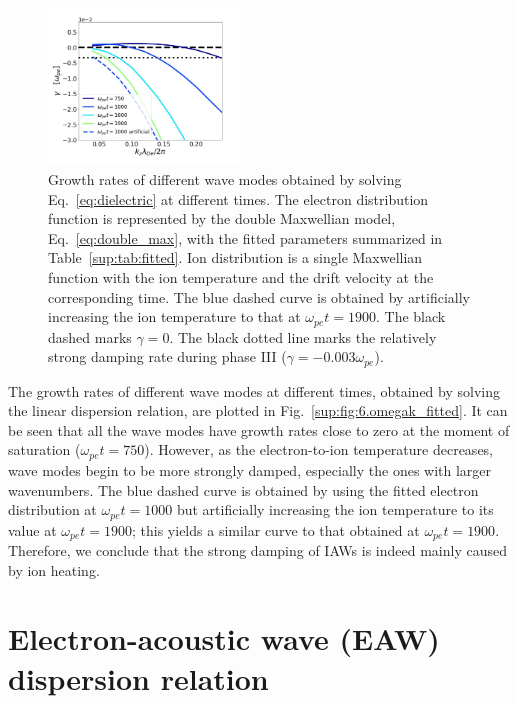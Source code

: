 \documentclass[%
 reprint,
 amsmath,
 amssymb,
 aps,
 prx,
floatfix,
superscriptaddress
]{revtex4-2}
\begin{document}
\begin{figure}[!htbp]
  \includegraphics[width=0.45\textwidth]{Fig_app_3.jpg}
\caption{\label{sup:fig:6.omegak_fitted} Growth rates of different wave modes obtained by solving Eq.~\eqref{eq:dielectric} at different times. The electron distribution function is represented by the double Maxwellian model, Eq.~\eqref{eq:double_max}, with the fitted parameters summarized in Table~\ref{sup:tab:fitted}. 
Ion distribution is a single Maxwellian function with the ion temperature and the drift velocity at the corresponding time. The blue dashed curve is obtained by artificially increasing the ion temperature to that at $\omega_{pe}t=1900$. The black dashed marks $\gamma = 0$. The black dotted line marks the relatively strong damping rate during phase III ($\gamma = - 0.003\omega_{pe}$). }
\label{sup:1D}
\end{figure}
 
The growth rates of different wave modes at different times, obtained by solving the linear dispersion relation, are plotted in Fig.~\ref{sup:fig:6.omegak_fitted}.
It can be seen that all the wave modes have growth rates close to zero at the moment of saturation ($\omega_{pe}t=750$).
However, as the electron-to-ion temperature decreases, wave modes begin to be more strongly damped, especially the ones with larger wavenumbers.
The blue dashed curve is obtained by using the fitted electron distribution at $\omega_{pe}t=1000$ but artificially increasing the ion temperature to its value at $\omega_{pe}t=1900$; this yields a similar curve to that obtained at $\omega_{pe}t=1900$.
Therefore, we conclude that the strong damping of IAWs is indeed mainly caused by ion heating. 

\section{Electron-acoustic wave (EAW) dispersion relation~\label{app:3}}
\end{document}
